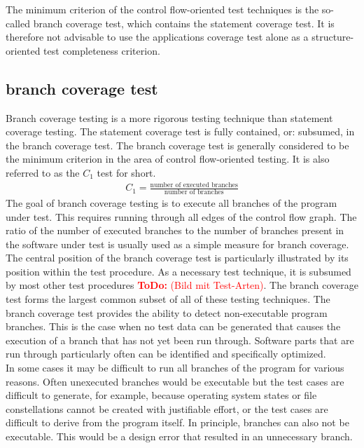 \documentclass[master,english,smartquotes,apa]{hgbthesis}
\newcommand{\TODO}[1]{\textcolor{red}{\textbf{ToDo:} #1}}
\begin{document}
	The minimum criterion of the control flow-oriented test techniques is the so-called branch coverage test, which contains the statement coverage test. It is therefore not advisable to use the applications coverage test alone as a structure-oriented test completeness criterion.

	\subsection{branch coverage test}
	Branch coverage testing is a more rigorous testing technique than statement coverage testing. The statement coverage test is fully contained, or: subsumed, in the branch coverage test. The branch coverage test is generally considered to be the minimum criterion in the area of control flow-oriented testing. It is also referred to as the $C_1$ test for short.
		\begin{align*}
		C_1 = \frac{\textrm{number of executed branches}}{\textrm{number of branches}}
		\end{align*}
	The goal of branch coverage testing is to execute all branches of the program under test. This requires running through all edges of the control flow graph. The ratio of the number of executed branches to the number of branches present in the software under test is usually used as a simple measure for branch coverage. The central position of the branch coverage test is particularly illustrated by its position within the test procedure. As a necessary test technique, it is subsumed by most other test procedures \TODO{(Bild mit Test-Arten)}. The branch coverage test forms the largest common subset of all of these testing techniques. The branch coverage test provides the ability to detect non-executable program branches. This is the case when no test data can be generated that causes the execution of a branch that has not yet been run through. Software parts that are run through particularly often can be identified and specifically optimized. \\
	In some cases it may be difficult to run all branches of the program for various reasons. Often unexecuted branches would be executable but the test cases are difficult to generate, for example, because operating system states or file constellations cannot be created with justifiable effort, or the test cases are difficult to derive from the program itself. In principle, branches can also not be executable. This would be a design error that resulted in an unnecessary branch. \\
\end{document}
